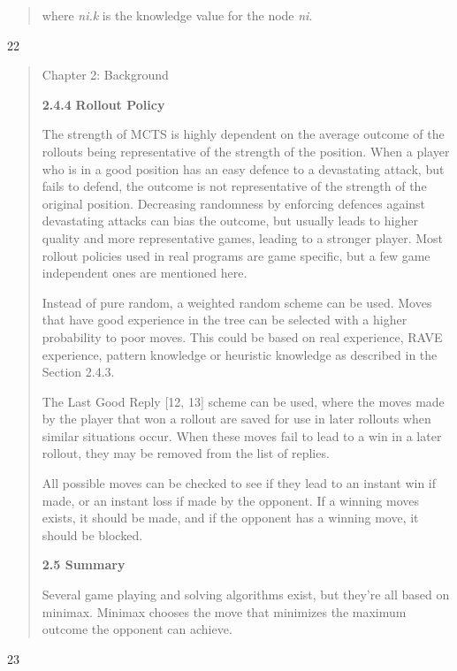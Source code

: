 \begin{quote}
where \emph{ni.k} is the knowledge value for the node \emph{ni}.
\end{quote}

22

\begin{quote}
Chapter 2: Background

\textbf{2.4.4} \textbf{Rollout Policy}

The strength of MCTS is highly dependent on the average outcome of the
rollouts being representative of the strength of the position. When a
player who is in a good position has an easy defence to a devastating
attack, but fails to defend, the outcome is not representative of the
strength of the original position. Decreasing randomness by enforcing
defences against devastating attacks can bias the outcome, but usually
leads to higher quality and more representative games, leading to a
stronger player. Most rollout policies used in real programs are game
specific, but a few game independent ones are mentioned here.

Instead of pure random, a weighted random scheme can be used. Moves that
have good experience in the tree can be selected with a higher
probability to poor moves. This could be based on real experience, RAVE
experience, pattern knowledge or heuristic knowledge as described in the
Section 2.4.3.

The Last Good Reply {[}12, 13{]} scheme can be used, where the moves
made by the player that won a rollout are saved for use in later
rollouts when similar situations occur. When these moves fail to lead to
a win in a later rollout, they may be removed from the list of replies.

All possible moves can be checked to see if they lead to an instant win
if made, or an instant loss if made by the opponent. If a winning moves
exists, it should be made, and if the opponent has a winning move, it
should be blocked.

\textbf{2.5 Summary}

Several game playing and solving algorithms exist, but they're all based
on minimax. Minimax chooses the move that minimizes the maximum outcome
the opponent can achieve.
\end{quote}

23

